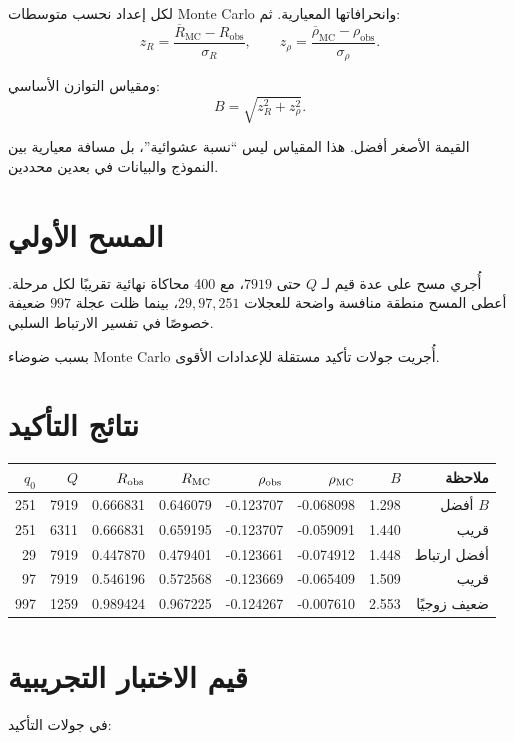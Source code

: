 \documentclass[12pt]{article}
\begin{document}
لكل إعداد نحسب متوسطات Monte Carlo وانحرافاتها المعيارية.
ثم:
\[
z_R
=
\frac{\overline R_{\mathrm{MC}}-R_{\mathrm{obs}}}
{\sigma_R},
\qquad
z_\rho
=
\frac{\overline \rho_{\mathrm{MC}}-\rho_{\mathrm{obs}}}
{\sigma_\rho}.
\]

ومقياس التوازن الأساسي:
\[
B
=
\sqrt{z_R^2+z_\rho^2}.
\]

القيمة الأصغر أفضل. هذا المقياس ليس ``نسبة عشوائية''، بل مسافة معيارية
بين النموذج والبيانات في بعدين محددين.

\section{المسح الأولي}

أُجري مسح على عدة قيم لـ \(Q\) حتى \(7919\)، مع 400 محاكاة نهائية تقريبًا
لكل مرحلة. أعطى المسح منطقة منافسة واضحة للعجلات \(29,97,251\)،
بينما ظلت عجلة \(997\) ضعيفة خصوصًا في تفسير الارتباط السلبي.

بسبب ضوضاء Monte Carlo أُجريت جولات تأكيد مستقلة للإعدادات الأقوى.

\section{نتائج التأكيد}

\begin{center}
\begin{tabular}{rrrrrrrr}
\toprule
\(q_0\) & \(Q\) & \(R_{\rm obs}\) & \(R_{\rm MC}\) &
\(\rho_{\rm obs}\) & \(\rho_{\rm MC}\) & \(B\) & ملاحظة\\
\midrule
251 & 7919 & 0.666831 & 0.646079 & -0.123707 & -0.068098 & 1.298 & أفضل \(B\)\\
251 & 6311 & 0.666831 & 0.659195 & -0.123707 & -0.059091 & 1.440 & قريب\\
29  & 7919 & 0.447870 & 0.479401 & -0.123661 & -0.074912 & 1.448 & أفضل ارتباط\\
97  & 7919 & 0.546196 & 0.572568 & -0.123669 & -0.065409 & 1.509 & قريب\\
997 & 1259 & 0.989424 & 0.967225 & -0.124267 & -0.007610 & 2.553 & ضعيف زوجيًا\\
\bottomrule
\end{tabular}
\end{center}

\section{قيم الاختبار التجريبية}

في جولات التأكيد:
\end{document}
